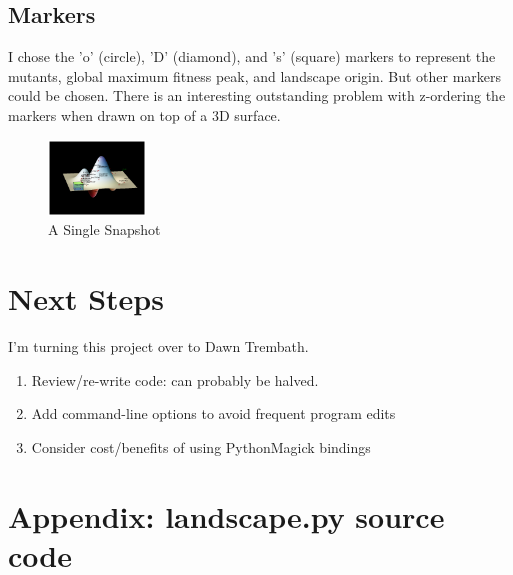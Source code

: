 \documentclass[10pt,letterpaper]{article}
\begin{document}
\subsection*{Markers}
I chose the 'o' (circle), 'D' (diamond), and 's' (square) markers to represent the mutants, global maximum fitness peak, and landscape origin. But other markers could be chosen. There is an interesting outstanding problem with z-ordering the markers when drawn on top of a 3D surface.

\begin{figure}
\centering
\includegraphics[width=0.23\textwidth,scale=0.2]{fitness.png}
\caption{\label{fig:reticules}A Single Snapshot}
\end{figure}

\section*{Next Steps}

I'm turning this project over to Dawn Trembath.

\begin{enumerate}[itemsep=1pt, topsep=2pt, partopsep=0pt]
\item Review/re-write code: can probably be halved.
\item Add command-line options to avoid frequent program edits
\item Consider cost/benefits of using PythonMagick bindings
\end{enumerate}


{}

\pagebreak

\section{Appendix: landscape.py source code}
\newcommand*{\SrcPath}{..}

\end{document}
